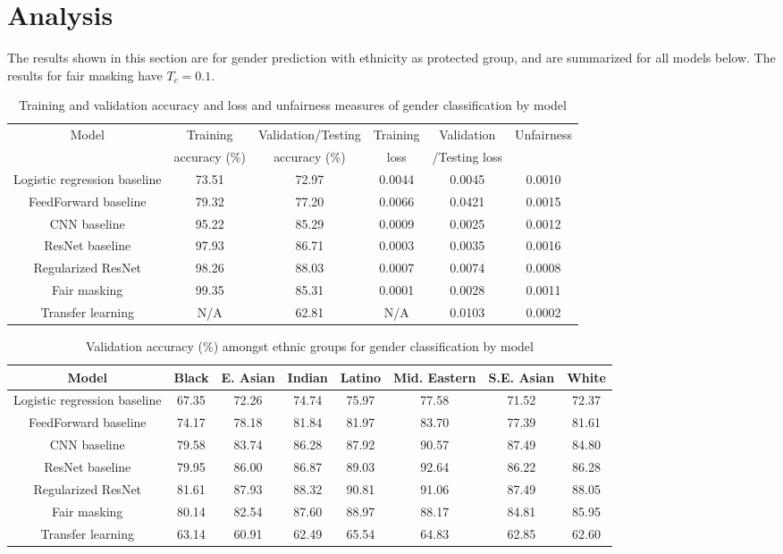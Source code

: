 \section{Analysis}

The results shown in this section are for gender prediction with ethnicity as protected group, and are summarized for all models below. The results for fair masking have $T_c = 0.1$.

\begin{table}[ht]
	\centering
	\begin{tabular}{ |c|c|c|c|c|c| } 
		\hline
		 Model & Training & Validation/Testing & Training & Validation & Unfairness \\
		  & accuracy (\%) & accuracy (\%) & loss & /Testing loss & \\
		 \hline
		 Logistic regression baseline & 73.51 & 72.97 &  0.0044 &  0.0045 & 0.0010\\
		 FeedForward baseline & 79.32 & 77.20 & 0.0066 & 0.0421 & 0.0015 \\
		 CNN baseline & 95.22 & 85.29 & 0.0009 & 0.0025 & 0.0012 \\
		 ResNet baseline & 97.93 & 86.71 & 0.0003 & 0.0035 & 0.0016 \\
		 Regularized ResNet & 98.26 & 88.03 & 0.0007 & 0.0074 & 0.0008 \\
		 Fair masking & 99.35 &  85.31 & 0.0001 & 0.0028 & 0.0011 \\
		 Transfer learning & N/A & 62.81 & N/A & 0.0103 & 0.0002 \\
		\hline
	\end{tabular}
	\caption{Training and validation accuracy and loss and unfairness measures of gender classification by model}
	\label{nnOA}
\end{table}

\begin{table}[ht]
	\centering
	\begin{tabular}{ |c|c|c|c|c|c|c|c| } 
		\hline
		 Model & Black & E. Asian & Indian & Latino & Mid. Eastern & S.E. Asian & White\\
		 
		 \hline
		 Logistic regression baseline & 67.35 & 72.26 &  74.74 &  75.97 & 77.58 & 71.52 & 72.37\\
		 FeedForward baseline & 74.17 & 78.18 & 81.84 & 81.97 &83.70&77.39&81.61\\
		 CNN baseline & 79.58&83.74&86.28&87.92&90.57&87.49&84.80 \\
		 ResNet baseline & 79.95&86.00&86.87&89.03&92.64&86.22&86.28\\
		 Regularized ResNet & 81.61&87.93&88.32&90.81&91.06&87.49&88.05 \\
		 Fair masking & 80.14&82.54&87.60&88.97&88.17&84.81&85.95 \\
		 Transfer learning & 63.14 &60.91 &62.49&65.54&64.83&62.85&62.60 \\
		\hline
	\end{tabular}
	\caption{Validation accuracy (\%) amongst ethnic groups for gender classification by model}
	\label{nnOA}
\end{table}

